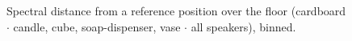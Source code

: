 \begin{figure}[t]
\centering

\caption{Spectral distance from a reference position over the floor (cardboard $\cdot$ candle, cube, soap-dispenser, vase $\cdot$ all speakers), binned.}
\label{fig:spectral_distance_all_binned}
\end{figure}
